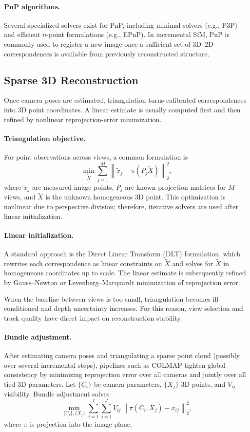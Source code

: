 \documentclass{report}
\begin{document}
\paragraph{PnP algorithms.}
Several specialized solvers exist for PnP, including minimal solvers (e.g., P3P) and efficient $n$-point formulations (e.g., EPnP). In incremental SfM, PnP is commonly used to register a new image once a sufficient set of 3D--2D correspondences is available from previously reconstructed structure.

\subsection{Sparse 3D Reconstruction}
Once camera poses are estimated, triangulation turns calibrated correspondences into 3D point coordinates. A linear estimate is usually computed first and then refined by nonlinear reprojection-error minimization.

\paragraph{Triangulation objective.}
For point observations across views, a common formulation is
\[
\min_{\tilde{X}} \sum_{j=1}^{M} \left\| \tilde{x}_j-\pi(P_j\tilde{X}) \right\|_2^2,
\]
where $\tilde{x}_j$ are measured image points, $P_j$ are known projection matrices for $M$ views, and $\tilde{X}$ is the unknown homogeneous 3D point.
This optimization is nonlinear due to perspective division; therefore, iterative solvers are used after linear initialization.

\paragraph{Linear initialization.}
A standard approach is the Direct Linear Transform (DLT) formulation, which rewrites each correspondence as linear constraints on $\tilde{X}$ and solves for $\tilde{X}$ in homogeneous coordinates up to scale. The linear estimate is subsequently refined by Gauss--Newton or Levenberg--Marquardt minimization of reprojection error.

When the baseline between views is too small, triangulation becomes ill-conditioned and depth uncertainty increases. For this reason, view selection and track quality have direct impact on reconstruction stability.

\paragraph{Bundle adjustment.}
After estimating camera poses and triangulating a sparse point cloud (possibly over several incremental steps), pipelines such as COLMAP tighten global consistency by minimizing reprojection error over all cameras and jointly over all tied 3D parameters. Let $\{C_i\}$ be camera parameters, $\{X_j\}$ 3D points, and $V_{ij}$ visibility. Bundle adjustment solves
\[
\min_{\{C_i\},\{X_j\}}
\sum_{i=1}^{I}\sum_{j=1}^{J}V_{ij}\,
\left\|
\pi(C_i, X_j)-x_{ij}
\right\|_2^2,
\]
where $\pi$ is projection into the image plane.
\end{document}
